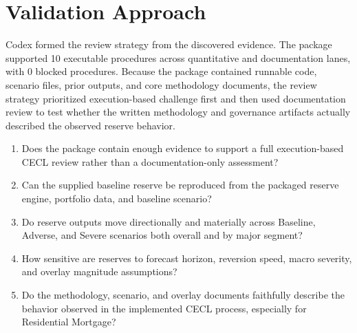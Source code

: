 \documentclass[11pt]{article}
\begin{document}
\section*{Validation Approach}
Codex formed the review strategy from the discovered evidence. The package supported 10 executable procedures across quantitative and documentation lanes, with 0 blocked procedures.
Because the package contained runnable code, scenario files, prior outputs, and core methodology documents, the review strategy prioritized execution-based challenge first and then used documentation review to test whether the written methodology and governance artifacts actually described the observed reserve behavior.
\begin{enumerate}
\item Does the package contain enough evidence to support a full execution-based CECL review rather than a documentation-only assessment?
\item Can the supplied baseline reserve be reproduced from the packaged reserve engine, portfolio data, and baseline scenario?
\item Do reserve outputs move directionally and materially across Baseline, Adverse, and Severe scenarios both overall and by major segment?
\item How sensitive are reserves to forecast horizon, reversion speed, macro severity, and overlay magnitude assumptions?
\item Do the methodology, scenario, and overlay documents faithfully describe the behavior observed in the implemented CECL process, especially for Residential Mortgage?
\end{enumerate}
\end{document}
